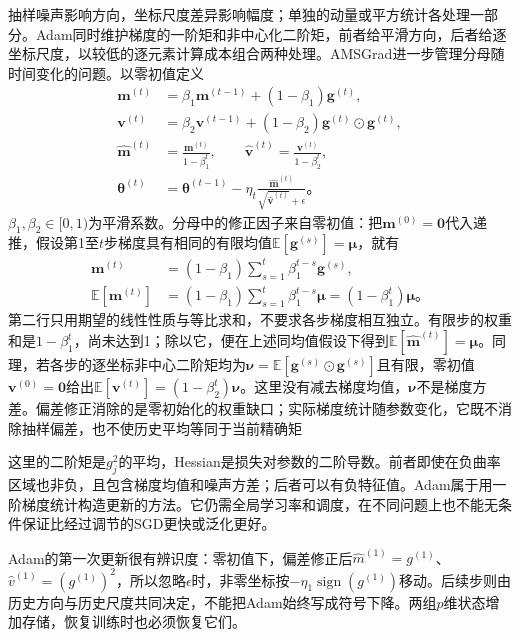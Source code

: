 抽样噪声影响方向，坐标尺度差异影响幅度；单独的动量或平方统计各处理一部分。Adam同时维护梯度的一阶矩和非中心化二阶矩，前者给平滑方向，后者给逐坐标尺度，以较低的逐元素计算成本组合两种处理。AMSGrad进一步管理分母随时间变化的问题。以零初值定义
\begin{align}
  \bm m^{(t)}&=\beta_1\bm m^{(t-1)}+(1-\beta_1)\bm g^{(t)},\\
  \bm v^{(t)}&=\beta_2\bm v^{(t-1)}+(1-\beta_2)
                 \bm g^{(t)}\odot\bm g^{(t)},\\
  \hat{\bm m}^{(t)}&=\frac{\bm m^{(t)}}{1-\beta_1^t},\qquad
  \hat{\bm v}^{(t)}=\frac{\bm v^{(t)}}{1-\beta_2^t},\\
  \bm\theta^{(t)}&=\bm\theta^{(t-1)}-
    \eta_t\frac{\hat{\bm m}^{(t)}}{\sqrt{\hat{\bm v}^{(t)}}+\epsilon}\text{。}
  \label{eq:training-adam}
\end{align}
$\beta_1,\beta_2\in[0,1)$为平滑系数。分母中的修正因子来自零初值：把$\bm m^{(0)}=\bm0$代入递推，假设第1至$t$步梯度具有相同的有限均值$\mathbb E[\bm g^{(s)}]=\bm\mu$，就有
\begin{equation}
  \begin{aligned}
    \bm m^{(t)}&=(1-\beta_1)\sum_{s=1}^{t}\beta_1^{t-s}\bm g^{(s)},\\
    \mathbb E[\bm m^{(t)}]
      &=(1-\beta_1)\sum_{s=1}^{t}\beta_1^{t-s}\bm\mu
        =(1-\beta_1^t)\bm\mu\text{。}
  \end{aligned}
  \label{eq:training-adam-bias-correction}
\end{equation}
第二行只用期望的线性性质与等比求和，不要求各步梯度相互独立。有限步的权重和是$1-\beta_1^t$，尚未达到1；除以它，便在上述同均值假设下得到$\mathbb E[\hat{\bm m}^{(t)}]=\bm\mu$。同理，若各步的逐坐标非中心二阶矩均为$\bm\nu=\mathbb E[\bm g^{(s)}\odot\bm g^{(s)}]$且有限，零初值$\bm v^{(0)}=\bm0$给出$\mathbb E[\bm v^{(t)}]=(1-\beta_2^t)\bm\nu$。这里没有减去梯度均值，$\bm\nu$不是梯度方差。偏差修正消除的是零初始化的权重缺口；实际梯度统计随参数变化，它既不消除抽样偏差，也不使历史平均等同于当前精确矩

这里的二阶矩是$g_j^2$的平均，Hessian是损失对参数的二阶导数。前者即使在负曲率区域也非负，且包含梯度均值和噪声方差；后者可以有负特征值。Adam属于用一阶梯度统计构造更新的方法。它仍需全局学习率和调度，在不同问题上也不能无条件保证比经过调节的SGD更快或泛化更好。

Adam的第一次更新很有辨识度：零初值下，偏差修正后$\hat m^{(1)}=g^{(1)}$、$\hat v^{(1)}=(g^{(1)})^2$，所以忽略$\epsilon$时，非零坐标按$-\eta_1\operatorname{sign}(g^{(1)})$移动。后续步则由历史方向与历史尺度共同决定，不能把Adam始终写成符号下降。两组$p$维状态增加存储，恢复训练时也必须恢复它们。


